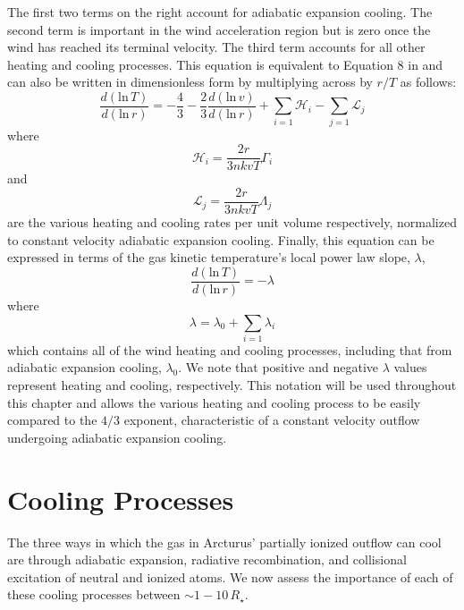 The first two terms on the right account for adiabatic expansion cooling. The second term is important in the wind acceleration region but is zero once the wind has reached its terminal velocity. The third term accounts for all other heating and cooling processes. This equation is equivalent to Equation 8 in \cite{goldreich_1976} and can also be written in dimensionless form \citep{rodgers_1991} by multiplying across by $r/T$ as follows:
\begin{equation} 
\label{eq:7.8}
\frac{d(\mathrm{ln}\,T)}{d(\mathrm{ln}\,r)}=-\frac{4}{3}-\frac{2}{3}\frac{d(\mathrm{ln}\,v)}{d(\mathrm{ln}\,r)}+\displaystyle\sum_{i=1}\mathcal{H}_{i}-\displaystyle\sum_{j=1}\mathcal{L}_{j}
\end{equation} 
where 
\begin{equation}
\mathcal{H}_{i}=\frac{2r}{3nkvT}\Gamma_{i} 
\end{equation} 
and 
\begin{equation}
\label{eq:1.10}
\mathcal{L}_{j}=\frac{2r}{3nkvT}\Lambda_{j}
\end{equation} 
are the various heating and cooling rates per unit volume respectively, normalized to constant velocity adiabatic expansion cooling. Finally, this equation can be expressed in terms of the gas kinetic temperature's local power law slope, $\lambda$, 
\begin{equation} \label{eq:lambda}
\frac{d(\mathrm{ln}\,T)}{d(\mathrm{ln}\,r)}=-\lambda
\end{equation}
where 
\begin{equation}
\lambda =\lambda_{0}+\displaystyle\sum_{i=1}\lambda_{i}
\end{equation} 
which contains all of the wind heating and cooling processes, including that from adiabatic expansion cooling, $\lambda_{0}$. We note that positive and negative $\lambda$ values represent heating and cooling, respectively. This notation will be used throughout this chapter and allows the various heating and cooling process to be easily compared to the $4/3$ exponent, characteristic of a constant velocity outflow undergoing adiabatic expansion cooling.

\section{Cooling Processes}\label{sec:7.3}
The three ways in which the gas in Arcturus' partially ionized outflow can cool are through adiabatic expansion, radiative recombination, and collisional excitation of neutral and ionized atoms. We now assess the importance of each of these cooling processes between $\sim 1-10\,R_{\star}$. 

